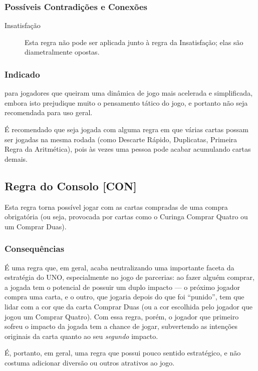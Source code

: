 \subsubsection{Possíveis Contradições e Conexões}

\begin{description}
\item[Insatisfação]{Esta regra não pode ser aplicada junto à regra da Insatisfação; elas são diametralmente opostas.}
\end{description}

\subsubsection{Indicado} 

para jogadores que queiram uma dinâmica de jogo mais acelerada e simplificada, embora isto prejudique muito o pensamento tático do jogo, e portanto não seja recomendada para uso geral.

É recomendado que seja jogada com alguma regra em que várias cartas possam ser jogadas na mesma rodada (como Descarte Rápido, Duplicatas, Primeira Regra da Aritmética), pois às vezes uma pessoa pode acabar acumulando cartas demais.

\subsection{Regra do Consolo [CON]}

Esta regra torna possível jogar com as cartas compradas de uma compra obrigatória (ou seja, provocada por cartas como o Curinga Comprar Quatro ou um Comprar Duas).

\subsubsection{Consequências}

É uma regra que, em geral, acaba neutralizando uma importante faceta da estratégia do UNO, especialmente no jogo de parcerias: ao fazer alguém comprar, a jogada tem o potencial de possuir um duplo impacto --- o próximo jogador compra uma carta, e o outro, que jogaria depois do que foi ``punido'', tem que lidar com a cor que da carta Comprar Duas (ou a cor escolhida pelo jogador que jogou um Comprar Quatro). Com essa regra, porém, o jogador que primeiro sofreu o impacto da jogada tem a chance de jogar, subvertendo as intenções originais da carta quanto ao seu \emph{segundo} impacto.

É, portanto, em geral, uma regra que possui pouco sentido estratégico, e não costuma adicionar diversão ou outros atrativos ao jogo.

